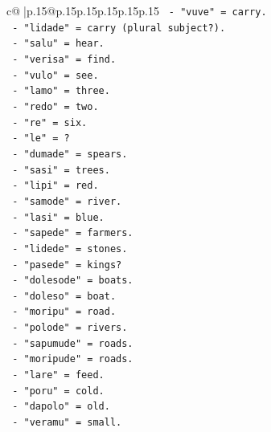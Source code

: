 \documentclass{article}
\begin{document}
{\begin{supertabular}{c@{$\;$}|p{.15\linewidth}@{}p{.15\linewidth}p{.15\linewidth}p{.15\linewidth}p{.15\linewidth}p{.15\linewidth}}
{{{\texttt{                        {-} "vuve" = carry.} \\
\texttt{                        {-} "lidade" = carry (plural subject?).} \\
\texttt{                        {-} "salu" = hear.} \\
\texttt{                        {-} "verisa" = find.} \\
\texttt{                        {-} "vulo" = see.} \\
\texttt{                        {-} "lamo" = three.} \\
\texttt{                        {-} "redo" = two.} \\
\texttt{                        {-} "re" = six.} \\
\texttt{                        {-} "le" = ?} \\
\texttt{                        {-} "dumade" = spears.} \\
\texttt{                        {-} "sasi" = trees.} \\
\texttt{                        {-} "lipi" = red.} \\
\texttt{                        {-} "samode" = river.} \\
\texttt{                        {-} "lasi" = blue.} \\
\texttt{                        {-} "sapede" = farmers.} \\
\texttt{                        {-} "lidede" = stones.} \\
\texttt{                        {-} "pasede" = kings?} \\
\texttt{                        {-} "dolesode" = boats.} \\
\texttt{                        {-} "doleso" = boat.} \\
\texttt{                        {-} "moripu" = road.} \\
\texttt{                        {-} "polode" = rivers.} \\
\texttt{                        {-} "sapumude" = roads.} \\
\texttt{                        {-} "moripude" = roads.} \\
\texttt{                        {-} "lare" = feed.} \\
\texttt{                        {-} "poru" = cold.} \\
\texttt{                        {-} "dapolo" = old.} \\
\texttt{                        {-} "veramu" = small.} \\
}}}
\end{supertabular}}
\end{document}
